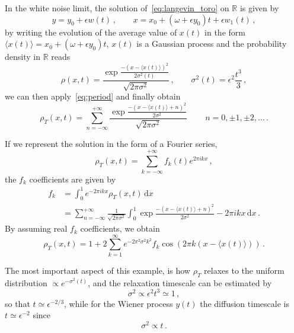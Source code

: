 In the white noise limit, the solution of~\eqref{eq:langevin_toro} on \(\mathbb{R}\) is given by
\begin{equation}
	y = y_0 + \epsilon w(t)\,, \qquad x = x_0 + (\omega + \epsilon y_0) t + \epsilon w_1(t) \,,
\end{equation}
by writing the evolution of the average value of \(x(t)\) in the form \(\langle x(t) \rangle = x_0 + (\omega + \epsilon y_0) t\), $x(t)$ is a Gaussian process and the probability density in \(\mathbb{R}\) reads
\begin{equation}
	\rho(x,t) = \frac{\exp{\frac{-(x-\langle x(t)\rangle)^2}{2\sigma^2(t)}}}{\sqrt{2\pi\sigma^2}}\,, \qquad \sigma^2(t) = \epsilon^2 \frac{t^3}{3}\,,
\end{equation}
we can then apply~\eqref{eq:period} and finally obtain
\begin{equation}
	\rho_T(x,t) = \sum_{n=-\infty}^{+\infty} \frac{\exp{\frac{-(x-\langle x(t)\rangle + n)^2}{2\sigma^2}}}{\sqrt{2\pi\sigma^2}} \,\qquad n = 0,\pm 1, \pm 2, \ldots\,.
\end{equation}

If we represent the solution in the form of a Fourier series,
\begin{equation}
	\rho_T(x,t) = \sum_{k=-\infty}^{+\infty} f_k(t)e^{2\pi i k x} \,,
\end{equation}
the \(f_k\) coefficients are given by
\begin{align}
	f_k &= \int_0^1 e^{-2\pi i k x} \rho_T(x,t)\,\mathrm{d}x \\
	&= \sum_{n=-\infty}^{+\infty} \frac{1}{\sqrt{2\pi\sigma^2}} \int_0^1 \exp{\frac{-(x-\langle x(t) \rangle + n)^2}{2\sigma^2} -2\pi i k x}\,\mathrm{d}x \,.
\end{align}
By assuming real \(f_k\) coefficients, we obtain
\begin{equation}
	\rho_T(x,t) = 1+2\sum_{k=1}^\infty e^{-2\pi^2\sigma^2k^2} f_k \cos(2\pi k (x-\langle x(t) \rangle)) \,.
\end{equation}

The most important aspect of this example, is how \(\rho_T\) relaxes to the uniform distribution \(\propto e^{-\sigma^2(t)}\), and the relaxation timescale can be estimated by
\begin{equation}
	\sigma^2 \propto \epsilon^2 t^{3}\simeq 1 \,,
\end{equation}
so that $t\simeq \epsilon^{-2/3}$,
while for the Wiener process $y(t)$ the diffusion timescale is $t\simeq \epsilon^{-2}$ since
\begin{equation}
	\sigma^2 \propto t \,.
\end{equation}

